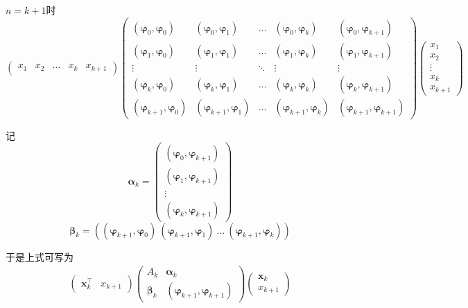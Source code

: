 \documentclass{article}
\begin{document}
\begin{CJK*}{UTF8}{gbsn}
$n = k + 1$时 \\
\[
\left(
\begin{array}{ccccc}
x_1 & x_2 & \ldots & x_k & x_{k + 1}
\end{array}
\right)
\left(
\begin{array}{ccccc}
(\bm{\varphi}_0, \bm{\varphi}_0) & (\bm{\varphi}_0, \bm{\varphi}_1) & \ldots & (\bm{\varphi}_0, \bm{\varphi}_k) & (\bm{\varphi}_0, \bm{\varphi}_{k + 1}) \\
(\bm{\varphi}_1, \bm{\varphi}_0) & (\bm{\varphi}_1, \bm{\varphi}_1) & \ldots & (\bm{\varphi}_1, \bm{\varphi}_k) & (\bm{\varphi}_1, \bm{\varphi}_{k + 1}) \\
\vdots & \vdots & \ddots & \vdots & \vdots \\
(\bm{\varphi}_k, \bm{\varphi}_0) & (\bm{\varphi}_k, \bm{\varphi}_1) & \ldots & (\bm{\varphi}_k, \bm{\varphi}_k) & (\bm{\varphi}_k, \bm{\varphi}_{k + 1}) \\
(\bm{\varphi}_{k + 1}, \bm{\varphi}_0) & (\bm{\varphi}_{k + 1}, \bm{\varphi}_1) & \ldots & (\bm{\varphi}_{k + 1}, \bm{\varphi}_k) & (\bm{\varphi}_{k + 1}, \bm{\varphi}_{k + 1})
\end{array}
\right)
\left(
\begin{array}{c}
x_1 \\ x_2 \\ \vdots \\ x_k \\ x_{k + 1}
\end{array}
\right)
\]

记
\[
\bm{\alpha}_k =
\left(
\begin{array}{c}
(\bm{\varphi}_0, \bm{\varphi}_{k + 1}) \\
(\bm{\varphi}_1, \bm{\varphi}_{k + 1}) \\
\vdots \\
(\bm{\varphi}_k, \bm{\varphi}_{k + 1})
\end{array}
\right)
\]
\[
\bm{\beta}_k =
((\bm{\varphi}_{k + 1}, \bm{\varphi}_0) \ 
(\bm{\varphi}_{k + 1}, \bm{\varphi}_1) \ 
\ldots \ 
(\bm{\varphi}_{k + 1}, \bm{\varphi}_k))
\]

于是上式可写为
\[
\begin{aligned}
\left(
\begin{array}{cc}
\bm{x}_k^\top & x_{k + 1}
\end{array}
\right)
\left(
\begin{array}{cc}
A_k & \bm{\alpha}_k \\
\bm{\beta}_k & (\bm{\varphi}_{k + 1}, \bm{\varphi}_{k + 1})
\end{array}
\right)
\left(
\begin{array}{c}
\bm{x}_k \\ x_{k + 1}
\end{array}
\right)
\end{aligned}
\]


\end{CJK*}
\end{document}
